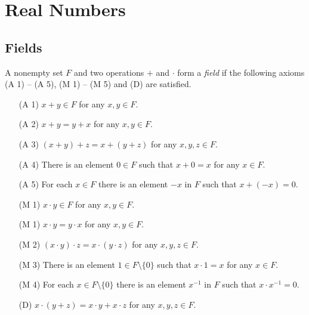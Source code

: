 \chapter{Real Numbers}
\section{Fields}
\begin{definition}
  A nonempty set $F$ and two operations $+$ and $\cdot$ form a \emph{field} if
  the following axioms (A 1) -- (A 5), (M 1) -- (M 5) and (D) are satisfied.
  \begin{enumerate}[leftmargin=3.5em]
    \item[(A 1)] $x + y \in F$ for any $x, y \in F$.
    \item[(A 2)] $x + y  = y + x$ for any $x, y \in F$.
    \item[(A 3)] $(x + y) + z = x + (y + z)$ for any $x, y, z \in F$.
    \item[(A 4)] There is an element $0 \in F$ such that $x + 0 = x$ for any
    $x \in F$.
    \item[(A 5)] For each $x \in F$ there is an element $-x$ in $F$ such that
    $x + (-x) = 0$.
    \item[(M 1)] $x \cdot y \in F$ for any $x, y \in F$.
    \item[(M 1)] $x \cdot y  = y \cdot x$ for any $x, y \in F$.
    \item[(M 2)] $(x \cdot y) \cdot z = x \cdot (y \cdot z)$ for any
    $x, y, z \in F$.
    \item[(M 3)] There is an element $1 \in F \setminus \{0\}$ such that
    $x \cdot 1 = x$ for any $x \in F$.
    \item[(M 4)] For each $x \in F \setminus \{0\}$ there is an element
    $x^{-1}$ in $F$ such that $x \cdot x^{-1} = 0$.
    \item[(D)] $x \cdot (y + z) = x \cdot y + x \cdot z$ for any
    $x, y, z \in F$.
  \end{enumerate}
\end{definition}

